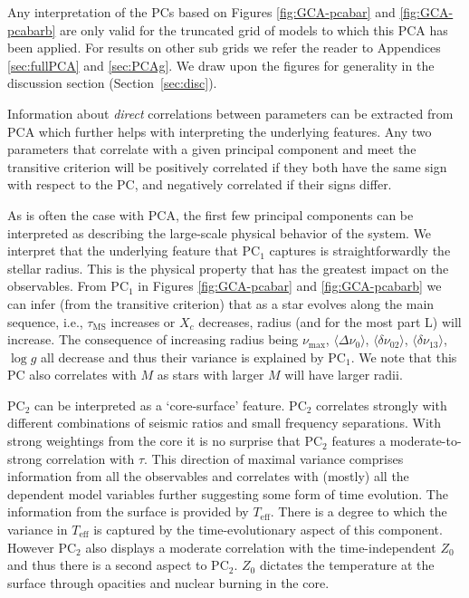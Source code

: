 Any interpretation of the PCs based on Figures \ref{fig:GCA-pcabar} and \ref{fig:GCA-pcabarb} are only valid for the truncated grid of models to which this PCA has been applied. For results on other sub grids we refer the reader to Appendices \ref{sec:fullPCA} and \ref{sec:PCAg}. 
We draw upon the figures for generality in the discussion section (Section~\ref{sec:disc}).


Information about \emph{direct} correlations between parameters can be extracted from PCA which further helps with interpreting the underlying features.
Any two parameters that correlate with a given principal component and meet the transitive criterion will be positively correlated if they both have the same sign with respect to the PC, and negatively correlated if their signs differ. 

As is often the case with PCA, the first few principal components can be interpreted as describing the large-scale physical behavior of the system.
We interpret that the underlying feature that PC$_1$ captures is straightforwardly the stellar radius.  
This is the physical property that has the greatest impact on the observables.
From PC$_1$ in Figures \ref{fig:GCA-pcabar} and \ref{fig:GCA-pcabarb} we can infer (from the transitive criterion) that as a star evolves along the main sequence, i.e., $\tau_{\text{MS}}$ increases or $X_c$ decreases, radius (and for the most part L) will increase.  
The consequence of increasing radius being $\nu_{\max}$, 
${\langle\Delta\nu_0\rangle}$,
${\langle\delta\nu_{02}\rangle}$, 
${\langle\delta\nu_{13}\rangle}$,
 ${\log{} g}$ all decrease and thus their variance is explained by PC$_1$. 
We note that this PC also correlates with $M$ as stars with larger $M$ will have larger radii.  


PC$_2$ can be interpreted as a `core-surface' feature.
PC$_2$ correlates strongly with different combinations of seismic ratios and small frequency separations. %
With strong weightings from the core it is no surprise that PC$_2$ features a moderate-to-strong correlation with $\tau$.  
This direction of maximal variance comprises information from all the observables and correlates with (mostly) all the dependent model variables further suggesting some form of time evolution. 
The information from the surface is provided by $T_{\text{eff}}$.  
There is a degree to which the variance in $T_{\text{eff}}$ is captured by the time-evolutionary aspect of this component. 
However PC$_2$ also displays a moderate correlation with the time-independent $Z_0$ and thus there is a second aspect to  PC$_2$.
$Z_0$ dictates the temperature at the surface through opacities and nuclear burning in the core.

